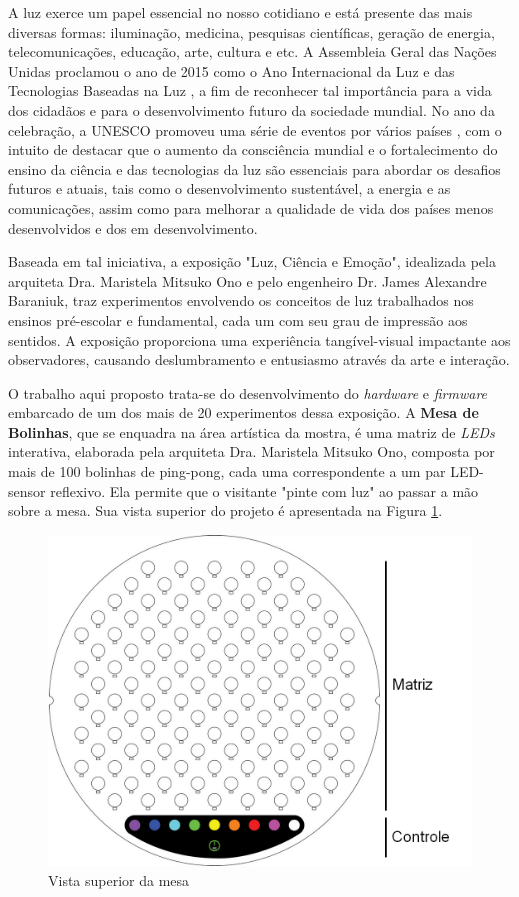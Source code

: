 \documentclass[a4paper,12pt]{article}
\begin{document}
  A luz exerce um papel essencial no nosso cotidiano e está presente das mais diversas formas: iluminação, medicina, pesquisas científicas, geração de energia, telecomunicações, educação, arte, cultura e etc. A Assembleia Geral das Nações Unidas proclamou o ano de 2015 como o Ano Internacional da Luz e das Tecnologias Baseadas na Luz \cite{resolucao-onu}, a fim de reconhecer tal importância para a vida dos cidadãos e para o desenvolvimento futuro da sociedade mundial. No ano da celebração, a UNESCO promoveu uma série de eventos por vários países \cite{eventos-unesco}, com o intuito de destacar que o aumento da consciência mundial e o fortalecimento do ensino da ciência e das tecnologias da luz são essenciais para abordar os desafios futuros e atuais, tais como o desenvolvimento sustentável, a energia e as comunicações, assim como para melhorar a qualidade de vida dos países menos desenvolvidos e dos em desenvolvimento.
  
  Baseada em tal iniciativa, a exposição "Luz, Ciência e Emoção", idealizada pela arquiteta Dra. Maristela Mitsuko Ono e pelo engenheiro Dr. James Alexandre Baraniuk, traz experimentos envolvendo os conceitos de luz trabalhados nos ensinos pré-escolar e fundamental, cada um com seu grau de impressão aos sentidos. A exposição proporciona uma experiência tangível-visual impactante aos observadores, causando deslumbramento e entusiasmo através da arte e interação.
  
  O trabalho aqui proposto trata-se do desenvolvimento do \emph{hardware} e \emph{firmware} embarcado de um dos mais de 20 experimentos dessa exposição. A \textbf{Mesa de Bolinhas}, que se enquadra na área artística da mostra, é uma matriz de \emph{LEDs} interativa, elaborada pela arquiteta Dra. Maristela Mitsuko Ono, composta por mais de 100 bolinhas de ping-pong, cada uma correspondente a um par LED-sensor reflexivo. Ela permite que o visitante "pinte com luz" ao passar a mão sobre a mesa. Sua vista superior do projeto é apresentada na Figura \ref{fig:mesa-sup}.
  	
  \begin{figure}[H]
    \caption{Vista superior da mesa}
    \label{fig:mesa-sup}
    \centering
    \includegraphics[width=0.7\linewidth]{img/mesa-cad.png}
  \end{figure}	
	
\end{document}
